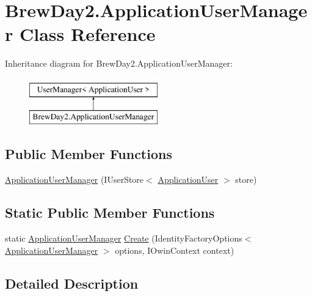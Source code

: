 \hypertarget{class_brew_day2_1_1_application_user_manager}{}\section{Brew\+Day2.\+Application\+User\+Manager Class Reference}
\label{class_brew_day2_1_1_application_user_manager}
Inheritance diagram for Brew\+Day2.\+Application\+User\+Manager\+:\begin{figure}[H]
\begin{center}
\leavevmode
\includegraphics[height=2.000000cm]{class_brew_day2_1_1_application_user_manager}
\end{center}
\end{figure}
\subsection*{Public Member Functions}
\begin{DoxyCompactItemize}
\item 
\mbox{\hyperlink{class_brew_day2_1_1_application_user_manager_af0cbb46137f5ab4bde7c3aaae35fd7b5}{Application\+User\+Manager}} (I\+User\+Store$<$ \mbox{\hyperlink{class_brew_day2_1_1_models_1_1_application_user}{Application\+User}} $>$ store)
\end{DoxyCompactItemize}
\subsection*{Static Public Member Functions}
\begin{DoxyCompactItemize}
\item 
static \mbox{\hyperlink{class_brew_day2_1_1_application_user_manager}{Application\+User\+Manager}} \mbox{\hyperlink{class_brew_day2_1_1_application_user_manager_a3d7b87794f38aad3901618bbdb909b91}{Create}} (Identity\+Factory\+Options$<$ \mbox{\hyperlink{class_brew_day2_1_1_application_user_manager}{Application\+User\+Manager}} $>$ options, I\+Owin\+Context context)
\end{DoxyCompactItemize}


\subsection{Detailed Description}


